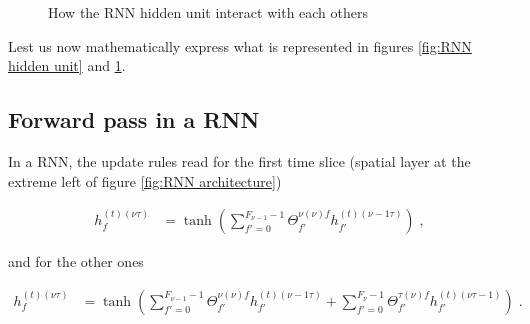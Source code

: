 \begin{figure}[H]
\begin{center}
\caption{\label{fig:RNN interaction}How the RNN hidden unit interact with each others}
\end{center}
\end{figure}


Lest us now mathematically express what is represented in figures \ref{fig:RNN hidden unit} and \ref{fig:RNN interaction}.

\subsection{Forward pass in a RNN}

 In a RNN, the update rules read for the first time slice (spatial layer at the extreme left of figure \ref{fig:RNN architecture})
 
\begin{align}
h^{(t)(\nu\tau)}_f&=\tanh\left(\sum_{f'=0}^{F_{{\nu-1}}-1}\Theta^{\nu(\nu)f}_{f'}
%
h^{(t)(\nu-1\tau)}_{f'}\right)\;,
\end{align}

and for the other ones

\begin{align}
h^{(t)(\nu\tau)}_f&=\tanh\left(\sum_{f'=0}^{F_{{\nu-1}}-1}\Theta^{\nu(\nu)f}_{f'}
%
h^{(t)(\nu-1\tau)}_{f'}+\sum_{f'=0}^{F_{{\nu}}-1}\Theta^{\tau(\nu)f}_{f'}
%
h^{(t)(\nu\tau-1)}_{f'}\right)\;.
\end{align}

